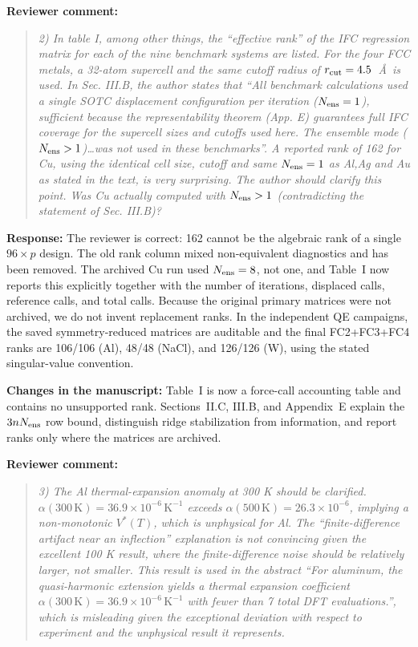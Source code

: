 \documentclass[11pt]{article}
\newcommand{\Question}[1]{\par\medskip\noindent\textbf{Reviewer comment:}\par\begin{quote}\itshape #1\end{quote}}
\newcommand{\Answer}[1]{\par\noindent\color{black}\normalfont\textbf{Response:} #1\par\smallskip}
\newcommand{\Change}[1]{\par\noindent\color{revisionblue}\normalfont\textbf{Changes in the manuscript:} #1\par\color{black}\medskip}
\begin{document}
\Question{2) In table I, among other things, the \textquotedblleft{}effective rank'' of the IFC regression matrix for each of the nine benchmark systems are listed. For the four FCC metals, a 32-atom supercell and the same cutoff radius of $r_{\rm cut}=4.5$~\AA\ is used. In Sec. III.B, the author states that \textquotedblleft{}All benchmark calculations used a single SOTC displacement configuration per iteration ($N_{\rm ens}=1$), sufficient because the representability theorem (App. E) guarantees full IFC coverage for the supercell sizes and cutoffs used here. The ensemble mode ($N_{\rm ens}>1$)\ldots was not used in these benchmarks''. A reported rank of 162 for Cu, using the identical cell size, cutoff and same $N_{\rm ens}=1$ as Al,Ag and Au as stated in the text, is very surprising. The author should clarify this point. Was Cu actually computed with $N_{\rm ens}>1$ (contradicting the statement of Sec. III.B)?}

\Answer{The reviewer is correct: 162 cannot be the algebraic rank of a single $96\times p$ design. The old rank column mixed non-equivalent diagnostics and has been removed. The archived Cu run used $N_{\rm ens}=8$, not one, and Table~I now reports this explicitly together with the number of iterations, displaced calls, reference calls, and total calls. Because the original primary matrices were not archived, we do not invent replacement ranks. In the independent QE campaigns, the saved symmetry-reduced matrices are auditable and the final FC2+FC3+FC4 ranks are 106/106 (Al), 48/48 (NaCl), and 126/126 (W), using the stated singular-value convention.}

\Change{Table~I is now a force-call accounting table and contains no unsupported rank. Sections~II.C, III.B, and Appendix~E explain the $3nN_{\rm ens}$ row bound, distinguish ridge stabilization from information, and report ranks only where the matrices are archived.}

\Question{3) The Al thermal-expansion anomaly at 300 K should be clarified. $\alpha(300\,\mathrm K)=36.9\times10^{-6}\,\mathrm K^{-1}$ exceeds $\alpha(500\,\mathrm K)=26.3\times10^{-6}$, implying a non-monotonic $V^*(T)$, which is unphysical for Al. The \textquotedblleft{}finite-difference artifact near an inflection'' explanation is not convincing given the excellent 100 K result, where the finite-difference noise should be relatively larger, not smaller. This result is used in the abstract \textquotedblleft{}For aluminum, the quasi-harmonic extension yields a thermal expansion coefficient $\alpha(300\,\mathrm K)=36.9\times10^{-6}\,\mathrm K^{-1}$ with fewer than 7 total DFT evaluations.'', which is misleading given the exceptional deviation with respect to experiment and the unphysical result it represents.}
\end{document}
